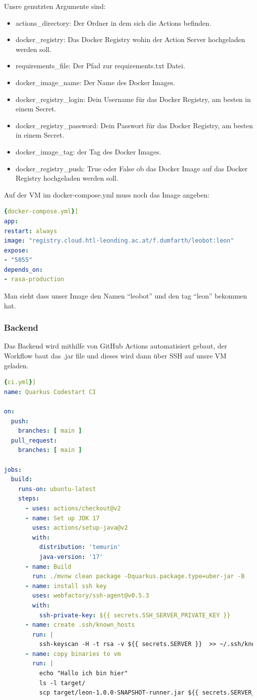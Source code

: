 Unsre genutzten Argumente sind:
\begin{itemize}
    \item actions\_directory: Der Ordner in dem sich die Actions befinden.
    \item docker\_registry: Das Docker Registry wohin der Action Server hochgeladen werden soll.
    \item requirements\_file: Der Pfad zur requirements.txt Datei.
    \item docker\_image\_name: Der Name des Docker Images.
    \item docker\_registry\_login: Dein Username für das Docker Registry, am besten in einem Secret.
    \item docker\_registry\_password: Dein Passwort für das Docker Registry, am besten in einem Secret.
    \item docker\_image\_tag: der Tag des Docker Images.
    \item docker\_registry\_push: True oder False ob das Docker Image auf das Docker Registry hochgeladen werden soll.
\end{itemize}

Auf der VM im docker-compose.yml muss noch das Image angeben:
\begin{lstlisting}[language=yaml,label={lst:dockercomposeyml},caption={docker-compose.yml}]{docker-compose.yml}]
app:
restart: always
image: "registry.cloud.htl-leonding.ac.at/f.dumfarth/leobot:leon"
expose:
- "5055"
depends_on:
- rasa-production
\end{lstlisting}

Man sieht dass unser Image den Namen ``leobot'' und den tag ``leon'' bekommen hat.

\subsubsection{Backend}
Das Backend wird mithilfe von GitHub Actions automatisiert gebaut, der Workflow baut das .jar file und dieses wird dann über SSH auf unsre VM geladen.

\begin{lstlisting}[language=yaml,label={lst:ciyml},caption={ci.yml}]{ci.yml}]
name: Quarkus Codestart CI

on:
  push:
    branches: [ main ]
  pull_request:
    branches: [ main ]

jobs:
  build:
    runs-on: ubuntu-latest
    steps:
      - uses: actions/checkout@v2
      - name: Set up JDK 17
        uses: actions/setup-java@v2
        with:
          distribution: 'temurin'
          java-version: '17'
      - name: Build
        run: ./mvnw clean package -Dquarkus.package.type=uber-jar -B
      - name: install ssh key
        uses: webfactory/ssh-agent@v0.5.3
        with:
          ssh-private-key: ${{ secrets.SSH_SERVER_PRIVATE_KEY }}
      - name: create .ssh/known_hosts
        run: |
          ssh-keyscan -H -t rsa -v ${{ secrets.SERVER }}  >> ~/.ssh/known_hosts
      - name: copy binaries to vm
        run: |
          echo "Hallo ich bin hier"
          ls -l target/
          scp target/leon-1.0.0-SNAPSHOT-runner.jar ${{ secrets.SERVER_USER }}@${{ secrets.SERVER }}:
\end{lstlisting}

